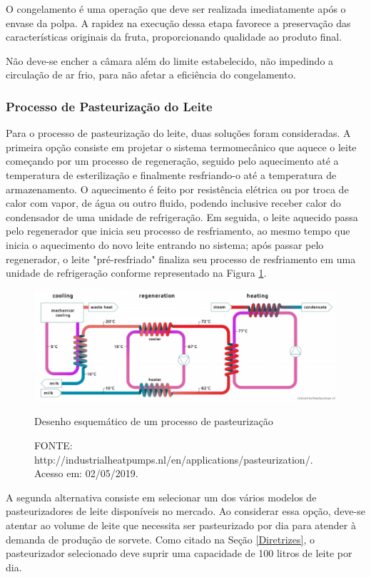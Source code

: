 \documentclass[10pt,a4paper]{article}
\begin{document}
O congelamento é uma operação que deve ser realizada imediatamente após o envase da polpa. A rapidez na execução dessa etapa favorece a preservação das características originais da fruta, proporcionando qualidade ao produto final.

Não deve-se encher a câmara além do limite estabelecido, não impedindo a circulação de ar frio, para não afetar a eficiência do congelamento.

\subsubsection{{ Processo de Pasteurização do Leite}}

Para o processo de pasteurização do leite, duas soluções foram consideradas. A primeira opção consiste em projetar o sistema termomecânico que aquece o leite começando por um processo de regeneração, seguido pelo aquecimento até a temperatura de esterilização e finalmente resfriando-o até a temperatura de armazenamento. O aquecimento é feito por resistência elétrica ou por troca de calor com vapor, de água ou outro fluido, podendo inclusive receber calor do condensador de uma unidade de refrigeração. Em seguida, o leite aquecido passa pelo regenerador que inicia seu processo de resfriamento, ao mesmo tempo que inicia o aquecimento do novo leite entrando no sistema; após passar pelo regenerador, o leite "pré-resfriado" finaliza seu processo de resfriamento em uma unidade de refrigeração conforme representado na Figura \ref{fig_pasteurization_process}. 

\begin{figure}[H]
    \centering
    \includegraphics[scale=0.75]{Figuras/pasteurization_process.png}
    \caption{Desenho esquemático de um processo de pasteurização}
    \caption*{FONTE: http://industrialheatpumps.nl/en/applications/pasteurization/. Acesso em: 02/05/2019.}
    \label{fig_pasteurization_process}
\end{figure}


A segunda alternativa consiste em selecionar um dos vários modelos de pasteurizadores de leite disponíveis no mercado. Ao considerar essa opção, deve-se atentar ao volume de leite que necessita ser pasteurizado por dia para atender à demanda de produção de sorvete. Como citado na Seção \ref{Diretrizes}, o pasteurizador selecionado deve suprir uma capacidade de 100 litros de leite por dia.
\end{document}
